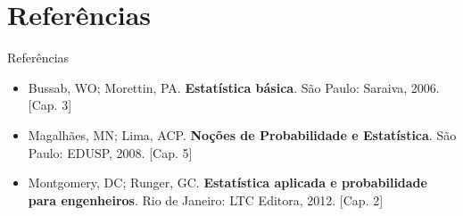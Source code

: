 \documentclass[10pt]{beamer}\usepackage[]{graphicx}\usepackage[]{color}
\theoremstyle{definition}
\begin{document}

\section{Referências}


\begin{frame}{Referências}
  \begin{itemize}
  \item Bussab, WO; Morettin, PA. \textbf{Estatística básica}. São
    Paulo: Saraiva, 2006. [Cap. 3]
  \item Magalhães, MN; Lima, ACP. \textbf{Noções de Probabilidade e
      Estatística}. São Paulo: EDUSP, 2008. [Cap. 5]
  \item Montgomery, DC; Runger, GC. \textbf{Estatística aplicada e
      probabilidade para engenheiros}. Rio de Janeiro: LTC Editora,
    2012. [Cap. 2]
  \end{itemize}
\end{frame}
\end{document}
